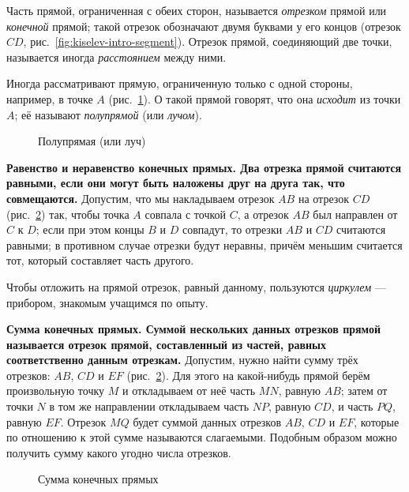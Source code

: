 Часть прямой, ограниченная с обеих сторон, называется \emph{отрезком} прямой или \emph{конечной} прямой; такой отрезок обозначают двумя буквами у его концов (отрезок \(CD\), рис.~\ref{fig:kiselev-intro-segment}). Отрезок прямой, соединяющий две точки, называется иногда \emph{расстоянием} между ними.

Иногда рассматривают прямую, ограниченную только с одной стороны, например, в точке \(A\) (рис.~\ref{fig:kiselev-intro-ray}). О такой прямой говорят, что она \emph{исходит} из точки \(A\); её называют \emph{полупрямой} (или \emph{лучом}).

\begin{figure}[htbp]
    \centering
    \captionsetup{name=Рис.,labelsep=period}
    
    \caption{Полупрямая (или луч)}
    \label{fig:kiselev-intro-ray}
\end{figure}

 \textbf{Равенство и неравенство конечных прямых. Два отрезка прямой считаются равными, если они могут быть наложены друг на друга так, что совмещаются.} Допустим, что мы накладываем отрезок \(AB\) на отрезок \(CD\) (рис.~\ref{fig:kiselev-intro-sum}) так, чтобы точка \(A\) совпала с точкой \(C\), а отрезок \(AB\) был направлен от \(C\) к \(D\); если при этом концы \(B\) и \(D\) совпадут, то отрезки \(AB\) и \(CD\) считаются равными; в противном случае отрезки будут неравны, причём меньшим считается тот, который составляет часть другого.

Чтобы отложить на прямой отрезок, равный данному, пользуются \emph{циркулем} --- прибором, знакомым учащимся по опыту.

 \textbf{Сумма конечных прямых. Суммой нескольких данных отрезков прямой называется отрезок прямой, составленный из частей, равных соответственно данным отрезкам.} Допустим, нужно найти сумму трёх отрезков: \(AB\), \(CD\) и \(EF\) (рис.~\ref{fig:kiselev-intro-sum}). Для
этого на какой-нибудь прямой берём произвольную точку \(M\) и откладываем от неё часть \(MN\), равную \(AB\); затем от точки \(N\) в том же направлении откладываем часть \(NP\), равную \(CD\), и часть \(PQ\), равную \(EF\). Отрезок \(MQ\) будет суммой данных отрезков \(AB\), \(CD\) и \(EF\), которые по отношению к этой сумме называются слагаемыми. Подобным образом можно получить сумму какого угодно числа отрезков.

\begin{figure}[htbp]
    \centering
    \captionsetup{name=Рис.,labelsep=period}
    
    \caption{Сумма конечных прямых}
    \label{fig:kiselev-intro-sum}
\end{figure}

